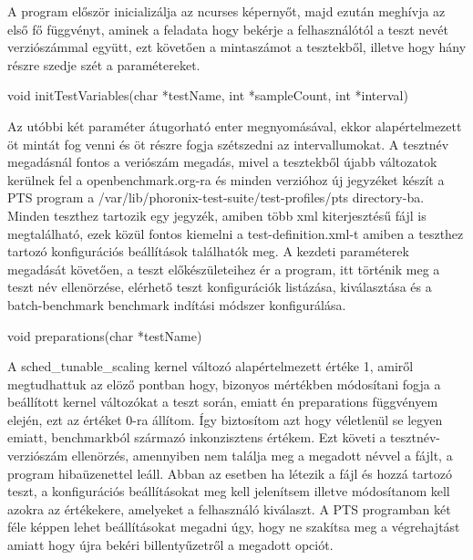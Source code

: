 
A program először inicializálja az ncurses képernyőt, majd ezután meghívja az első fő függvényt, aminek a feladata hogy bekérje a felhasználótól a teszt nevét verziószámmal együtt, ezt követően a mintaszámot a tesztekből, illetve hogy hány részre szedje szét a paramétereket.  
\begin{cpp}
void initTestVariables(char *testName, int *sampleCount, int *interval)
\end{cpp}
Az utóbbi két paraméter átugorható enter megnyomásával, ekkor alapértelmezett öt mintát fog venni és öt részre fogja szétszedni az intervallumokat. A tesztnév megadásnál fontos a veriószám megadás, mivel a tesztekből újabb változatok kerülnek fel a openbenchmark.org-ra és minden verzióhoz új jegyzéket készít a PTS program a /var/lib/phoronix-test-suite/test-profiles/pts directory-ba. Minden teszthez tartozik egy jegyzék, amiben több xml kiterjesztésű fájl is megtalálható, ezek közül fontos kiemelni a test-definition.xml-t amiben a teszthez tartozó konfigurációs beállítások találhatók meg.
A kezdeti paraméterek megadását követően, a teszt előkészületeihez ér a program, itt történik meg a teszt név ellenörzése, elérhető teszt konfigurációk listázása, kiválasztása és a batch-benchmark benchmark indítási módszer konfigurálása. 
\begin{cpp}
void preparations(char *testName)
\end{cpp}
A sched\_tunable\_scaling kernel változó alapértelmezett értéke 1, amiről megtudhattuk az elöző pontban hogy, bizonyos mértékben módosítani fogja a beállított kernel változókat a teszt során, emiatt én preparations függvényem elején, ezt az értéket 0-ra állítom. Így biztosítom azt hogy véletlenül se legyen emiatt, benchmarkból származó inkonzisztens értékem.
Ezt követi a tesztnév-verziószám ellenörzés, amennyiben nem találja meg a megadott névvel a fájlt, a program hibaüzenettel leáll.
Abban az esetben ha létezik a fájl és hozzá tartozó teszt, a konfigurációs beállításokat meg kell jelenítsem illetve módosítanom kell azokra az értékekere, amelyeket a felhasználó kiválaszt.
A PTS programban két féle képpen lehet beállításokat megadni úgy, hogy ne szakítsa meg a végrehajtást amiatt hogy újra bekéri billentyűzetről a megadott opciót.
